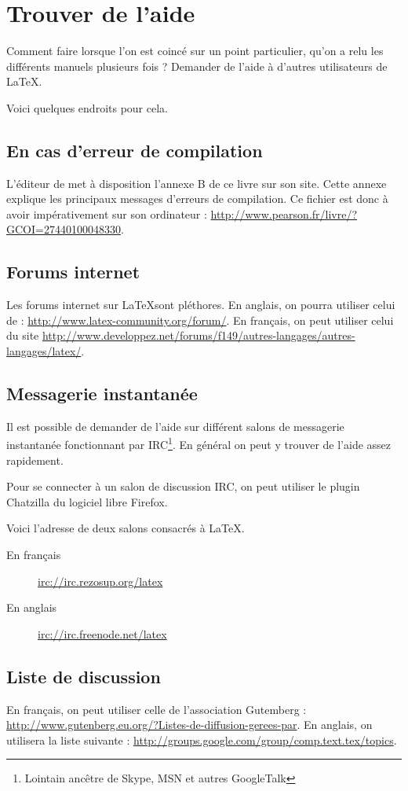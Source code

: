 \chapter{Trouver de l'aide}

\begin{prealable}
Comment faire lorsque l'on est coincé sur un point particulier, qu'on a relu les différents manuels plusieurs fois ? Demander de l'aide à d'autres utilisateurs de \LaTeX{}.

Voici quelques endroits pour cela. 
\end{prealable}

\section{En cas d'erreur de compilation}

L'éditeur de \cite{latex_companion} met à disposition l'annexe B de ce livre sur son site. Cette annexe explique les principaux messages d'erreurs de compilation. Ce fichier est donc à avoir impérativement sur son ordinateur : \url{http://www.pearson.fr/livre/?GCOI=27440100048330}.
\section{Forums internet}

Les forums internet sur \LaTeX sont pléthores. En anglais, on pourra utiliser celui de  : \url{http://www.latex-community.org/forum/}. En français, on peut utiliser celui du site  \url{http://www.developpez.net/forums/f149/autres-langages/autres-langages/latex/}.


\section{Messagerie instantanée}

Il est possible de demander de l'aide sur différent salons de messagerie instantanée fonctionnant par IRC\footnote{Lointain ancêtre de Skype, MSN et autres GoogleTalk}. En général on peut y trouver de l'aide assez rapidement.

Pour se connecter à un salon de discussion IRC, on peut utiliser le plugin Chatzilla du logiciel libre Firefox.

Voici l'adresse de deux salons consacrés à \LaTeX.

\begin{description}
\item[En français]\url{irc://irc.rezosup.org/latex}
\item[En anglais]\url{irc://irc.freenode.net/latex}
\end{description}

\section{Liste de discussion}

En français, on peut utiliser celle de l'association Gutemberg : \url{http://www.gutenberg.eu.org/?Listes-de-diffusion-gerees-par}. En anglais, on utilisera la liste suivante : \url{http://groups.google.com/group/comp.text.tex/topics}.
